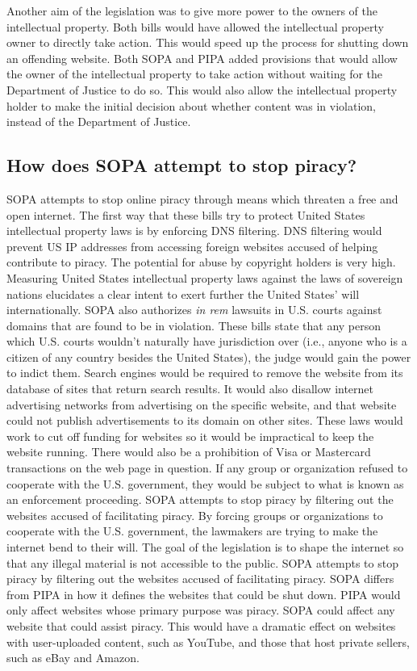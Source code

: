 \documentclass[11pt,journal,compsoc]{IEEEtran}
\begin{document}
\indent Another aim of the legislation was to give more power to the owners of the intellectual property. Both bills would have allowed the intellectual property owner to directly take action. This would speed up the process for shutting down an offending website. Both SOPA and PIPA added provisions that would allow the owner of the intellectual property to take action without waiting for the Department of Justice to do so. This would also allow the intellectual property holder to make the initial decision about whether content was in violation, instead of the Department of Justice. 


\subsection{How does SOPA attempt to stop piracy?}
SOPA attempts to stop online piracy through means which threaten a free and open internet. The first way that these bills try to protect United States intellectual property laws is by enforcing DNS filtering. DNS filtering would prevent US IP addresses from accessing foreign websites accused of helping contribute to piracy. The potential for abuse by copyright holders is very high. Measuring United States intellectual property laws against the laws of sovereign nations elucidates a clear intent to exert further the United States' will internationally. SOPA also authorizes \textit{in rem} lawsuits in U.S. courts against domains that are found to be in violation. These bills state that any person which U.S. courts wouldn't naturally have jurisdiction over (i.e., anyone who is a citizen of any country besides the United States), the judge would gain the power to indict them. Search engines would be required to remove the website from its database of sites that return search results. It would also disallow internet advertising networks from advertising on the specific website, and that website could not publish advertisements to its domain on other sites. These laws would work to cut off funding for websites so it would be impractical to keep the website running. There would also be a prohibition of Visa or Mastercard transactions on the web page in question. If any group or organization refused to cooperate with the U.S. government, they would be subject to what is known as an enforcement proceeding. SOPA attempts to stop piracy by filtering out the websites accused of facilitating piracy. By forcing groups or organizations to cooperate with the U.S. government, the lawmakers are trying to make the internet bend to their will. The goal of the legislation is to shape the internet so that any illegal material is not accessible to the public. SOPA attempts to stop piracy by filtering out the websites accused of facilitating piracy.
\indent SOPA differs from PIPA in how it defines the websites that could be shut down. PIPA would only affect websites whose primary purpose was piracy. SOPA could affect any website that could assist piracy. This would have a dramatic effect on websites with user-uploaded content, such as YouTube, and those that host private sellers, such as eBay and Amazon. 
\end{document}
